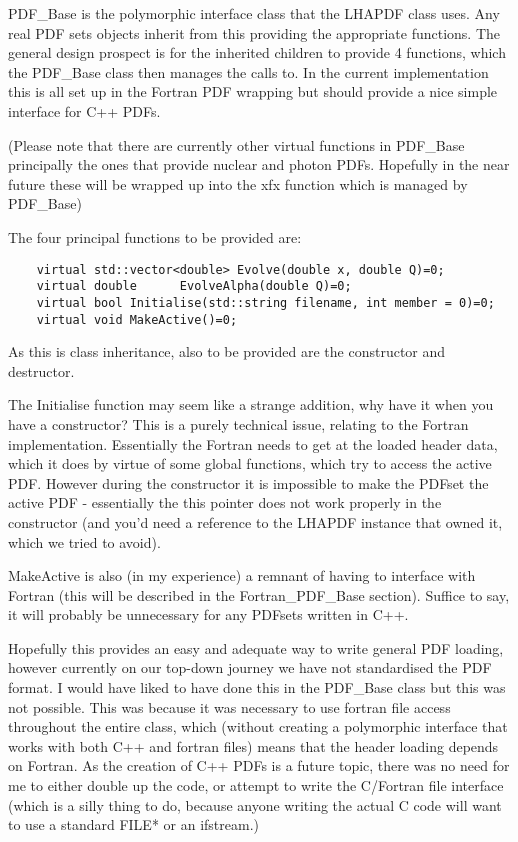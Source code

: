 PDF\_Base is the polymorphic interface class that the LHAPDF class uses.
Any real PDF sets objects inherit from this providing the appropriate
functions. The general design prospect is for the inherited children to
provide 4 functions, which the PDF\_Base class then manages the calls to.
In the current implementation this is all set up in the Fortran PDF wrapping
but should provide a nice simple interface for C++ PDFs. 

(Please note that there are currently other virtual functions in PDF\_Base
 principally the ones that provide nuclear and photon PDFs. Hopefully in the
 near future these will be wrapped up into the xfx function which is managed
 by PDF\_Base)

The four principal functions to be provided are:

  \begin{verbatim}
    virtual std::vector<double> Evolve(double x, double Q)=0;
    virtual double 		EvolveAlpha(double Q)=0;
    virtual bool Initialise(std::string filename, int member = 0)=0;
    virtual void MakeActive()=0;
  \end{verbatim}

As this is class inheritance, also to be provided are the constructor and
destructor. 

The Initialise function may seem like a strange addition, why have it when
you have a constructor? This is a purely technical issue, relating to the
Fortran implementation. Essentially the Fortran needs to get at the loaded
header data, which it does by virtue of some global functions, which try to
access the active PDF. However during the constructor it is impossible to
make the PDFset the active PDF - essentially the this pointer does not work
properly in the constructor (and you'd need a reference to the LHAPDF
instance that owned it, which we tried to avoid).

MakeActive is also (in my experience) a remnant of having to interface with
Fortran (this will be described in the Fortran\_PDF\_Base section). Suffice
to say, it will probably be unnecessary for any PDFsets written in C++.

Hopefully this provides an easy and adequate way to write general PDF
loading, however currently on our top-down journey we have not standardised
the PDF format. I would have liked to have done this in the PDF\_Base class
but this was not possible. This was because it was necessary to use fortran
file access throughout the entire class, which (without creating a
polymorphic interface that works with both C++ and fortran files) means that
the header loading depends on Fortran. As the creation of C++ PDFs is
a future topic, there was no need for me to either double up the code, or
attempt to write the C/Fortran file interface (which is a silly thing to do,
because anyone writing the actual C code will want to use a standard FILE*
or an ifstream.)
